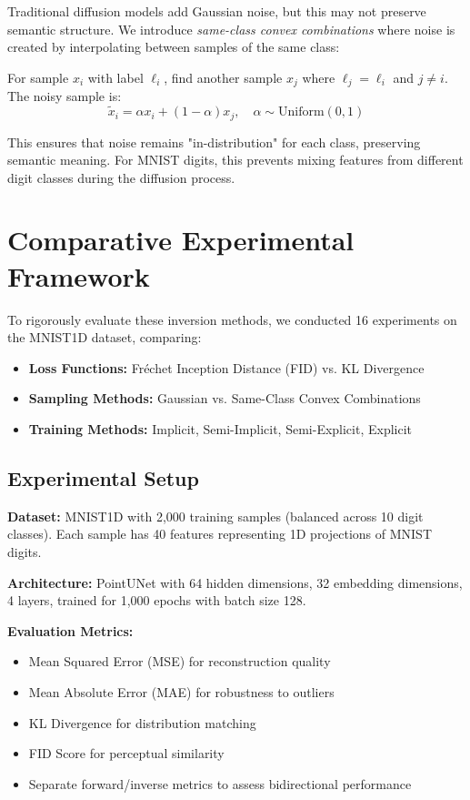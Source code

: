 \documentclass[sigconf]{acmart}
\begin{document}
Traditional diffusion models add Gaussian noise, but this may not preserve semantic structure. We introduce \textit{same-class convex combinations} where noise is created by interpolating between samples of the same class:

For sample $x_i$ with label $\ell_i$, find another sample $x_j$ where $\ell_j = \ell_i$ and $j \neq i$. The noisy sample is:
\begin{equation}
\tilde{x}_i = \alpha x_i + (1-\alpha)x_j, \quad \alpha \sim \text{Uniform}(0,1)
\end{equation}

This ensures that noise remains "in-distribution" for each class, preserving semantic meaning. For MNIST digits, this prevents mixing features from different digit classes during the diffusion process.

\section{Comparative Experimental Framework}

To rigorously evaluate these inversion methods, we conducted 16 experiments on the MNIST1D dataset, comparing:
\begin{itemize}
    \item \textbf{Loss Functions:} Fréchet Inception Distance (FID) vs. KL Divergence
    \item \textbf{Sampling Methods:} Gaussian vs. Same-Class Convex Combinations
    \item \textbf{Training Methods:} Implicit, Semi-Implicit, Semi-Explicit, Explicit
\end{itemize}

\subsection{Experimental Setup}

\textbf{Dataset:} MNIST1D with 2,000 training samples (balanced across 10 digit classes). Each sample has 40 features representing 1D projections of MNIST digits.

\textbf{Architecture:} PointUNet with 64 hidden dimensions, 32 embedding dimensions, 4 layers, trained for 1,000 epochs with batch size 128.

\textbf{Evaluation Metrics:}
\begin{itemize}
    \item Mean Squared Error (MSE) for reconstruction quality
    \item Mean Absolute Error (MAE) for robustness to outliers
    \item KL Divergence for distribution matching
    \item FID Score for perceptual similarity
    \item Separate forward/inverse metrics to assess bidirectional performance
\end{itemize}
\end{document}
